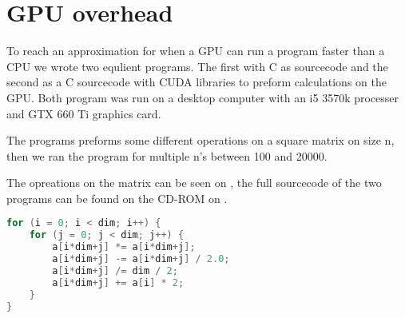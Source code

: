 \chapter{GPU overhead}
\label{app:gpuoverhead}
To reach an approximation for when a GPU can run a program faster than a CPU  we wrote two equlient programs.
The first with C as sourcecode and the second as a C sourcecode with CUDA libraries to preform calculations on the GPU.
Both program was run on a desktop computer with an i5 3570k processer and GTX 660 Ti graphics card.

The programs preforms some different operations on a square matrix on size n, then we ran the program for multiple n's between 100 and 20000.

The opreations on the matrix can be seen on , the full sourcecode of the two programs can be found on the CD-ROM on .

\begin{lstlisting}[language=C,caption={Operations on the matrix},label=gpuoversource,frame=single]
for (i = 0; i < dim; i++) {
	for (j = 0; j < dim; j++) {
		a[i*dim+j] *= a[i*dim+j];
		a[i*dim+j] -= a[i*dim+j] / 2.0;
		a[i*dim+j] /= dim / 2;
		a[i*dim+j] += a[i] * 2;
	}
}
\end{lstlisting}

